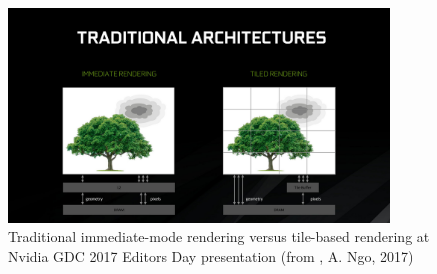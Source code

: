 \begin{figure}[htb]
  \centering
  \includegraphics[width=0.9\textwidth]{pictures/Nvidia_TileImmediate}
  \caption{Traditional immediate-mode rendering versus tile-based rendering at Nvidia GDC 2017 Editors Day presentation (from \cite{.08.02.2020}, A. Ngo, 2017)} \label{fig:blob}
\end{figure}